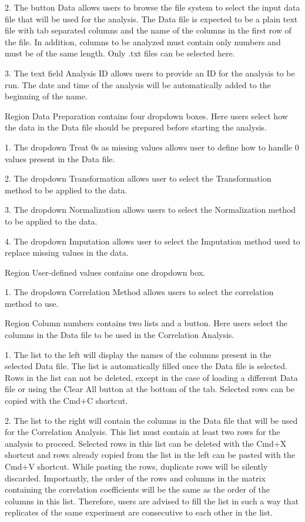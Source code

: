 \num{2}. The button Data allows users to browse the file system to select the input
data file that will be used for the analysis. The Data file is expected to be a
plain text file with tab separated columns and the name of the columns in the first
row of the file. In addition, columns to be analyzed must contain only numbers and
must be of the same length. Only .txt files can be selected here.

\num{3}. The text field Analysis ID allows users to provide an ID for the analysis
to be run. The date and time of the analysis will be automatically added to the
beginning of the name.

Region Data Preparation contains four dropdown boxes. Here users select how the data
in the Data file should be prepared before starting the analysis.

\num{1}. The dropdown Treat \num{0}s as missing values allows user to define how
to handle \num{0} values present in the Data file.

\num{2}. The dropdown Transformation allows user to select the Transformation method
to be applied to the data.

\num{3}. The dropdown Normalization allows users to select the Normalization method
to be applied to the data.

\num{4}. The dropdown Imputation allows user to select the Imputation method used
to replace missing values in the data.

Region User-defined values contains one dropdown box.

\num{1}. The dropdown Correlation Method allows users to select the correlation method
to use.

Region Column numbers contains two lists and a button. Here users select the columns
in the Data file to be used in the Correlation Analysis.

\num{1}. The list to the left will display the names of the columns present in the
selected Data file. The list is automatically filled once the Data file is selected.
Rows in the list can not be deleted, except in the case of loading a different Data
file or using the Clear All button at the bottom of the tab. Selected rows can be
copied with the Cmd+C shortcut.

\num{2}. The list to the right will contain the columns in the Data file that will
be used for the Correlation Analysis. This list must contain at least two rows for
the analysis to proceed. Selected rows in this list can be deleted with the Cmd+X
shortcut and rows already copied from the list in the left can be pasted with the
Cmd+V shortcut. While pasting the rows, duplicate rows will be silently discarded.
Importantly, the order of the rows and columns in the matrix containing the correlation
coefficients will be the same as the order of the columns in this list. Therefore,
users are advised to fill the list in such a way that replicates of the same experiment
are consecutive to each other in the list.

